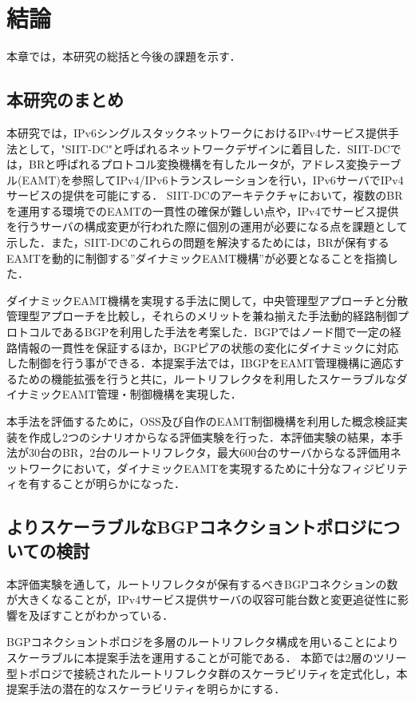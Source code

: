 \chapter{結論}
\label{conclusion}

本章では，本研究の総括と今後の課題を示す．

\section{本研究のまとめ}
本研究では，IPv6シングルスタックネットワークにおけるIPv4サービス提供手法として，"SIIT-DC"と呼ばれるネットワークデザインに着目した．SIIT-DCでは，BRと呼ばれるプロトコル変換機構を有したルータが，アドレス変換テーブル(EAMT)を参照してIPv4/IPv6トランスレーションを行い，IPv6サーバでIPv4サービスの提供を可能にする．
SIIT-DCのアーキテクチャにおいて，複数のBRを運用する環境でのEAMTの一貫性の確保が難しい点や，IPv4でサービス提供を行うサーバの構成変更が行われた際に個別の運用が必要になる点を課題として示した．また，SIIT-DCのこれらの問題を解決するためには，BRが保有するEAMTを動的に制御する”ダイナミックEAMT機構”が必要となることを指摘した．

ダイナミックEAMT機構を実現する手法に関して，中央管理型アプローチと分散管理型アプローチを比較し，それらのメリットを兼ね揃えた手法動的経路制御プロトコルであるBGPを利用した手法を考案した．BGPではノード間で一定の経路情報の一貫性を保証するほか，BGPピアの状態の変化にダイナミックに対応した制御を行う事ができる．本提案手法では，IBGPをEAMT管理機構に適応するための機能拡張を行うと共に，ルートリフレクタを利用したスケーラブルなダイナミックEAMT管理・制御機構を実現した．


本手法を評価するために，OSS及び自作のEAMT制御機構を利用した概念検証実装を作成し2つのシナリオからなる評価実験を行った．本評価実験の結果，本手法が30台のBR，2台のルートリフレクタ，最大600台のサーバからなる評価用ネットワークにおいて，ダイナミックEAMTを実現するために十分なフィジビリティを有することが明らかになった．

\section{よりスケーラブルなBGPコネクショントポロジについての検討}
\label{conclusion:tree}
本評価実験を通して，ルートリフレクタが保有するべきBGPコネクションの数が大きくなることが，IPv4サービス提供サーバの収容可能台数と変更追従性に影響を及ぼすことがわかっている．

BGPコネクショントポロジを多層のルートリフレクタ構成を用いることによりスケーラブルに本提案手法を運用することが可能である．
本節では2層のツリー型トポロジで接続されたルートリフレクタ群のスケーラビリティを定式化し，本提案手法の潜在的なスケーラビリティを明らかにする．

